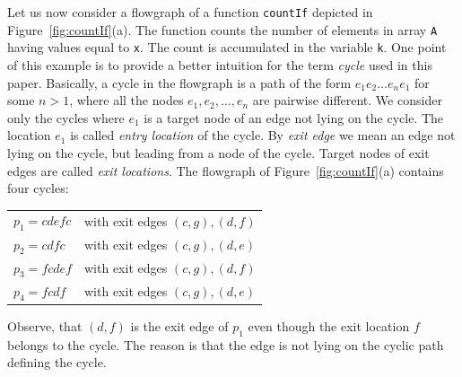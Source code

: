 \documentclass{sig-alternate}%
\begin{document}
\smallskip Let us now consider a flowgraph of a function \texttt{countIf}
depicted in Figure~\ref{fig:countIf}(a). The function counts the number of
elements in array \texttt{A} having values equal to \texttt{x}. The count is
accumulated in the variable \texttt{k}. One point of this example is to
provide a better intuition for the term \emph{cycle} used in this
paper. Basically, a cycle in the flowgraph is a path of the form
$e_1e_2\ldots e_ne_1$ for some $n>1$, where all the nodes
$e_1,e_2,\ldots,e_n$ are pairwise different. We consider only the cycles
where $e_1$ is a target node of an edge not lying on the cycle. The location
$e_1$ is called \emph{entry location} of the cycle. By \emph{exit edge} we
mean an edge not lying on the cycle, but leading from a node of the
cycle. Target nodes of exit edges are called \emph{exit locations}. The
flowgraph of Figure~\ref{fig:countIf}(a) contains four cycles:
\begin{center}
  \setlength{\tabcolsep}{2pt}
  \begin{tabular}{ll}
    $p_1=\mathit{cdefc}$ & with exit edges $(c,g),(d,f)$ \\
    $p_2=\mathit{cdfc}$ & with exit edges $(c,g),(d,e)$ \\
    $p_3=\mathit{fcdef}$ & with exit edges $(c,g),(d,f)$ \\
    $p_4=\mathit{fcdf}$ & with exit edges $(c,g),(d,e)$
  \end{tabular}
\end{center}

Observe, that $(d,f)$ is the exit edge of $p_1$ even though the exit
location $f$ belongs to the cycle. The reason is that the edge is not lying
on the cyclic path defining the cycle.
\end{document}
